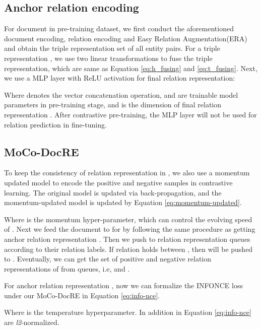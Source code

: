 \documentclass[11pt]{article}
\begin{document}
\subsection{Anchor relation encoding}
    For document  in pre-training dataset, we first conduct the aforementioned document encoding, relation encoding and Easy Relation Augmentation(ERA) and obtain the triple representation set  of all entity pairs. For a triple representation , we use two linear transformations to fuse the triple representation, which are same as Equation \ref{eq:h_fusing} and \ref{eq:t_fusing}. Next, we use a MLP layer with ReLU activation for final relation representation:
    
    Where  denotes the vector concatenation operation,  and  are trainable model parameters in pre-training stage, and  is the dimension of final relation representation . After contrastive pre-training, the MLP layer will not be used for relation prediction in fine-tuning.
\subsection{MoCo-DocRE}
    To keep the consistency of relation representation in , we also use a momentum updated model to encode the positive and negative samples in contrastive learning\citep{he_momentum_2020}. The original model  is updated via back-propagation, and the momentum-updated model  is updated by Equation \ref{eq:momentum-updated}. 
    
    Where  is the momentum hyper-parameter, which can control the evolving speed of . Next we feed the document  to  for  by following the same procedure as getting anchor relation representation . Then we push  to  relation representation queues according to their relation labels. If relation  holds between , then  will be pushed to . Eventually, we can get the set of positive and negative relation representations of  from queues, i.e,  and .
    
    For anchor relation representation , now we can formalize the INFONCE loss \citep{Oord_INFONCE_2018} under our MoCo-DocRE in Equation \ref{eq:info-nce}.
    
    Where  is the temperature hyperparameter. In addition  in Equation \ref{eq:info-nce} are \textit{l2}-normalized.
\end{document}
